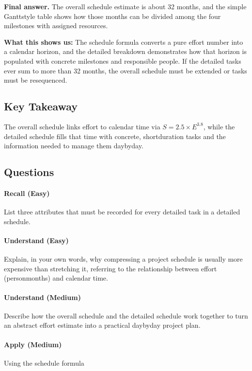\documentclass[12pt, a4paper]{article}
\begin{document}
\textbf{Final answer.}  
The overall schedule estimate is about 32 months, and the simple Ganttstyle table shows how those months can be divided among the four milestones with assigned resources.

\textbf{What this shows us:}  
The schedule formula converts a pure effort number into a calendar horizon, and the detailed breakdown demonstrates how that horizon is populated with concrete milestones and responsible people.  If the detailed tasks ever sum to more than 32 months, the overall schedule must be extended or tasks must be resequenced.

\subsection{Key Takeaway}
The overall schedule links effort to calendar time via \(S = 2.5 \times E^{3.8}\), while the detailed schedule fills that time with concrete, shortduration tasks and the information needed to manage them daybyday.

\subsection*{Questions}
\paragraph{Recall (Easy)} List three attributes that must be recorded for every detailed task in a detailed schedule.  
\newpage

\paragraph{Understand (Easy)} Explain, in your own words, why compressing a project schedule is usually more expensive than stretching it, referring to the relationship between effort (personmonths) and calendar time.  
\newpage

\paragraph{Understand (Medium)} Describe how the overall schedule and the detailed schedule work together to turn an abstract effort estimate into a practical daybyday project plan.  
\newpage

\paragraph{Apply (Medium)} Using the schedule formula  
\end{document}
